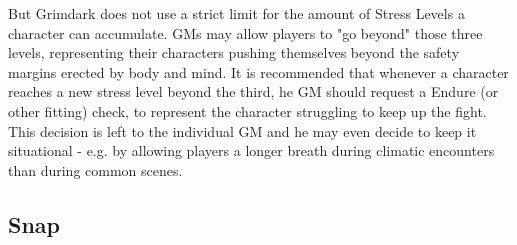 But Grimdark does not use a strict limit for the amount of Stress Levels a character can accumulate.
GMs may allow players to "go beyond" those three levels, representing their characters pushing themselves beyond the safety margins erected by body and mind.
It is recommended that whenever a character reaches a new stress level beyond the third, he GM should request a Endure (or other fitting) check, to represent the character struggling to keep up the fight.\\
This decision is left to the individual GM and he may even decide to keep it situational - e.g. by allowing players a longer breath during climatic encounters than during common scenes.

\subsection{Snap} %
\label{sub:snap}


